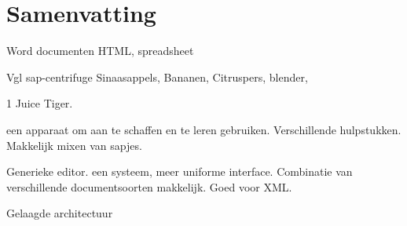 \chapter*{Samenvatting}


Word documenten HTML, spreadsheet

Vgl sap-centrifuge Sinaasappels, Bananen, 
Citruspers, blender, 

1 Juice Tiger. 

een apparaat om aan te schaffen en te leren gebruiken. Verschillende hulpstukken. Makkelijk mixen van sapjes.

Generieke editor. een systeem, meer uniforme interface. Combinatie van verschillende documentsoorten makkelijk. Goed voor XML.

Gelaagde architectuur